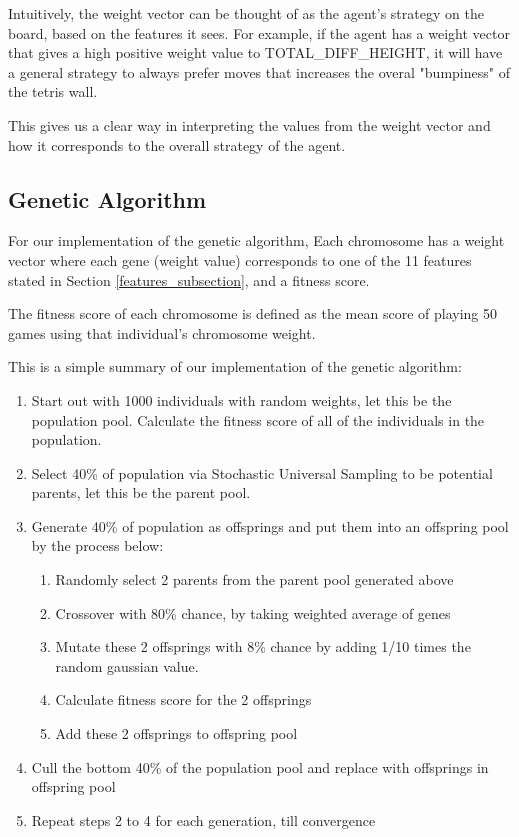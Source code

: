 \documentclass[a4paper,12pt,twocolumn]{article}
\begin{document}
Intuitively, the weight vector can be thought of as the agent's strategy on
the board, based on the features it sees. For example, if the agent has a weight
vector that gives a high positive weight value to TOTAL\_DIFF\_HEIGHT, it will have
a general strategy to always prefer moves that increases the overal "bumpiness" of
the tetris wall.

This gives us a clear way in interpreting the values from the weight vector and how
it corresponds to the overall strategy of the agent.

\subsection{Genetic Algorithm}
\label{genetic}
For our implementation of the genetic algorithm, Each chromosome has a weight
vector where each gene (weight value) corresponds to one of the 11 features
stated in Section \ref{features_subsection}, and a fitness score.


The fitness score of each chromosome is defined as the mean score of playing 50
games using that individual's chromosome weight.

This is a simple summary of our implementation of the genetic algorithm:
\begin{enumerate}
    \item Start out with 1000 individuals with random weights, let this be the population pool.
    Calculate the fitness score of all of the individuals in the population.
    \item Select 40\% of population via Stochastic Universal Sampling to be
            potential parents, let this be the parent pool.
    \item Generate 40\% of population as offsprings and put them into an offspring pool
    by the process below:
        \begin{enumerate}
            \item Randomly select 2 parents from the parent pool generated above
            \item Crossover with 80\% chance, by taking weighted average of genes
            \item Mutate these 2 offsprings with 8\% chance by adding 1/10 times
                the random gaussian value.
            \item Calculate fitness score for the 2 offsprings
            \item Add these 2 offsprings to offspring pool
        \end{enumerate}
    \item Cull the bottom 40\% of the population pool and replace with offsprings
    in offspring pool
    \item Repeat steps 2 to 4 for each generation, till convergence
\end{enumerate}
\end{document}
